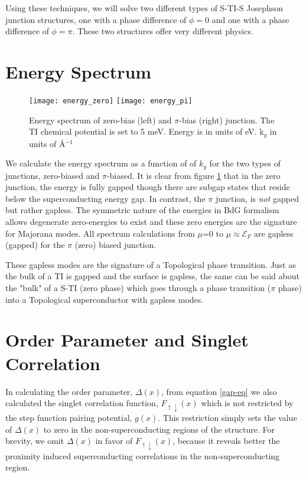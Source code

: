 \documentclass[11pt,revtex,aps]{report}
\begin{document}
Using these techniques, we will solve two different types of S-TI-S Josephson junction structures, one with a phase difference of $\phi=0$ and one with a phase difference of $\phi=\pi$. These two structures offer very different physics.


\clearpage

\section{Energy Spectrum}

\begin{figure}[h]
\texttt{[image: energy\_zero]}
\texttt{[image: energy\_pi]}
\caption{Energy spectrum of zero-bias (left) and $\pi$-bias (right) junction. The TI chemical potential is set to 5 meV. Energy is in units of eV. k$_y$ in units of \AA$^{-1}$
}\label{jj-energy}
\end{figure}

We calculate the energy spectrum as a function of of $k_y$ for the two types of junctions, zero-biased and $\pi$-biased. It is clear from figure \ref{jj-energy} that in the zero junction, the energy is fully gapped though there are subgap states that reside below the superconducting energy gap. In contrast, the $\pi$ junction, is {\it not} gapped but rather gapless. The symmetric nature of the energies in BdG formalism allows degenerate zero-energies to exist and these zero energies are the signature for Majorana modes. All spectrum calculations from $\mu$=0 to $\mu \approx \mathcal{E}_F $ are gapless (gapped) for the $\pi$ (zero) biased junction.

These gapless modes are the signature of a Topological phase transition. Just as the bulk of a TI is gapped and the surface is gapless, the same can be said about the "bulk" of a S-TI (zero phase) which goes through a phase transition ($\pi$ phase) into a Topological superconductor with gapless modes. 

\clearpage
\section{Order Parameter and Singlet Correlation}


In calculating the order parameter, $\Delta(x)$, from equation \ref{gap-eq} we also calculated the singlet correlation function, $F_{\uparrow\downarrow}(x)$ which is not restricted by the step function pairing potential, $g(x)$. This restriction simply sets the value of $\Delta(x)$ to zero in the non-superconducting regions of the structure. For brevity, we omit $\Delta(x)$ in favor of $F_{\uparrow\downarrow}(x)$, because it reveals better the proximity induced superconducting correlations in the non-superconducting region.
\end{document}
